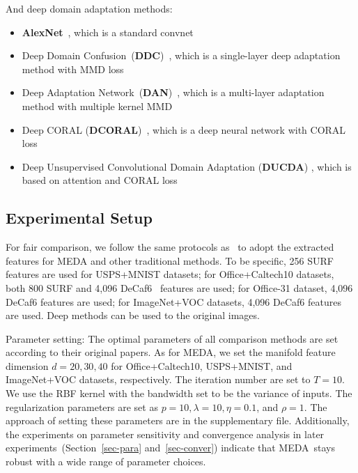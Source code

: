 \documentclass[sigconf]{acmart}
\begin{document}
And deep domain adaptation methods:

\begin{itemize}[noitemsep,nolistsep]
	\item \textbf{AlexNet}~\cite{krizhevsky2012imagenet}, which is a standard convnet
	\item Deep Domain Confusion~(\textbf{DDC})~\cite{tzeng2014deep}, which is a single-layer deep adaptation method with MMD loss
	\item Deep Adaptation Network~(\textbf{DAN})~\cite{long2015domain}, which is a multi-layer adaptation method with multiple kernel MMD
	\item Deep CORAL (\textbf{DCORAL})~\cite{sun2016deep}, which is a deep neural network with CORAL loss
	\item Deep Unsupervised Convolutional Domain Adaptation (\textbf{DUCDA}) \cite{zhuo2017deep}, which is based on attention and CORAL loss
\end{itemize}

\subsection{Experimental Setup}

For fair comparison, we follow the same protocols as~\cite{zhang2017joint,zhuo2017deep,wang2017balanced} to adopt the extracted features for MEDA and other traditional methods. To be specific, 256 SURF features are used for USPS+MNIST datasets; for Office+Caltech10 datasets, both 800 SURF and 4,096 DeCaf6~\cite{donahue2014decaf} features are used; for Office-31 dataset, 4,096 DeCaf6 features are used; for ImageNet+VOC datasets, 4,096 DeCaf6 features are used. Deep methods can be used to the original images. 

Parameter setting: The optimal parameters of all comparison methods are set according to their original papers. As for MEDA, we set the manifold feature dimension $d=20,30,40$ for Office+Caltech10, USPS+MNIST, and ImageNet+VOC datasets, respectively. The iteration number are set to $T=10$. We use the RBF kernel with the bandwidth set to be the variance of inputs. The regularization parameters are set as $p=10,\lambda=10,\eta=0.1$, and $\rho=1$. The approach of setting these parameters are in the supplementary file. Additionally, the experiments on parameter sensitivity and convergence analysis in later experiments~(Section~\ref{sec-para} and~\ref{sec-conver}) indicate that MEDA~stays robust with a wide range of parameter choices.
\end{document}
